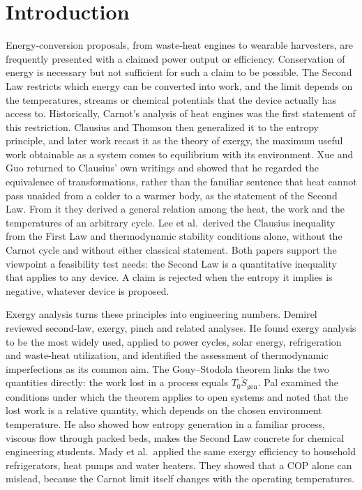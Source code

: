 \documentclass[journal=iecred,manuscript=article,layout=twocolumn,email=false]{achemso}
\begin{document}
\section{Introduction}
Energy-conversion proposals, from waste-heat engines to wearable harvesters, are frequently presented with a claimed
power output or efficiency. Conservation of energy is necessary but not sufficient for such a claim to be possible.
The Second Law restricts which energy can be converted into work, and the limit depends on the temperatures, streams
or chemical potentials that the device actually has access to. Historically, Carnot's analysis of heat engines was the
first statement of this restriction. Clausius and Thomson then generalized it to the entropy principle, and later work
recast it as the theory of exergy, the maximum useful work obtainable as a system comes to equilibrium with its
environment.\cite{Wang2017} Xue and Guo returned to Clausius' own writings and showed that he regarded the equivalence of
transformations, rather than the familiar sentence that heat cannot pass unaided from a colder to a warmer body, as the
statement of the Second Law. From it they derived a general relation among the heat, the work and the temperatures of
an arbitrary cycle.\cite{Xue2019} Lee et al.\ derived the Clausius inequality from the First Law and thermodynamic
stability conditions alone, without the Carnot cycle and without either classical statement.\cite{Lee2014} Both papers
support the viewpoint a feasibility test needs: the Second Law is a quantitative inequality that applies to any device.
A claim is rejected when the entropy it implies is negative, whatever device is proposed.

Exergy analysis turns these principles into engineering numbers. Demirel reviewed second-law, exergy, pinch and related analyses. He found exergy
analysis to be the most widely used, applied to power cycles, solar energy, refrigeration and waste-heat utilization,
and identified the assessment of thermodynamic imperfections as its common aim.\cite{Demirel2013} The Gouy--Stodola theorem links the two quantities directly: the work lost in a process
equals $T_0\dot S_\mathrm{gen}$. Pal examined the conditions under
which the theorem applies to open systems and noted that the lost work is a relative quantity, which depends on the
chosen environment temperature.\cite{Pal2017} He also showed how entropy generation in a
familiar process, viscous flow through packed beds, makes the Second Law concrete for chemical engineering
students.\cite{Pal2019} Mady et al.\ applied the same exergy efficiency to household refrigerators, heat pumps and
water heaters. They showed that a COP alone can mislead, because the Carnot limit itself changes with the operating
temperatures.\cite{Mady2020}
\end{document}

